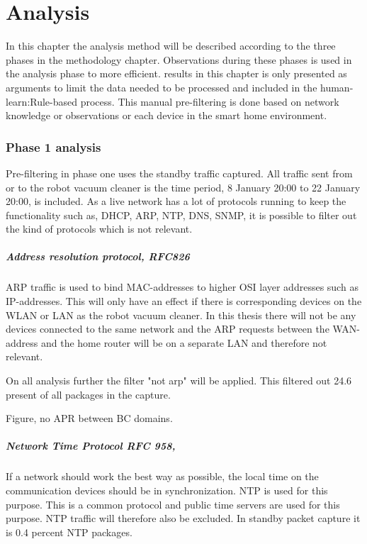 \chapter{Analysis}
In this chapter the analysis method will be described according to the three phases in the methodology chapter. Observations during these phases is used in the analysis phase to more efficient. results in this chapter is only presented as arguments to limit the data needed to be processed and included in the human-learn:Rule-based process. This manual pre-filtering is done based on network knowledge or observations or each device in the smart home environment.

\subsection{Phase 1 analysis}
Pre-filtering in phase one uses the standby traffic captured. All traffic sent from or to the robot vacuum cleaner is the time period, 8 January 20:00 to 22 January 20:00, is included. As a live network has a lot of protocols running to keep the functionality such as, DHCP, ARP, NTP, DNS, SNMP, it is possible to filter out the kind of protocols which is not relevant. 

\paragraph{Address resolution protocol, RFC826}
ARP traffic is used to bind MAC-addresses to higher OSI layer addresses such as IP-addresses. This will only have an effect if there is corresponding devices on the WLAN or LAN as the robot vacuum cleaner. In this thesis there will not be any devices connected to the same network and the ARP requests between the WAN-address and the home router will be on a separate LAN and therefore not relevant.\cite{rfc826}

On all analysis further the filter "not arp" will be applied. This filtered out 24.6 present of all packages in the capture.  

Figure, no APR between BC domains.

\paragraph{Network Time Protocol RFC 958,}
If a network should work the best way as possible, the local time on the communication devices should be in synchronization. NTP is used for this purpose. This is a common protocol and public time servers are used for this purpose. NTP traffic will therefore also be excluded. In standby packet capture it is 0.4 percent NTP packages.\cite{rfc958_ntp}

